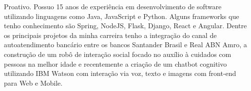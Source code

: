 

\begin{cvparagraph}

Proativo. Possuo 15 anos de experiência em desenvolvimento de software utilizando linguagens como Java, JavaScript e Python. Alguns frameworks que tenho conhecimento são Spring, NodeJS, Flask, Django, React e Angular. Dentre os principais projetos da minha carreira tenho a integração do canal de autoatendimento bancário entre os bancos Santander Brasil e Real ABN Amro, a construção de um robô de interação social focado no auxílio à cuidados com pessoas na melhor idade e recentemente a criação de um chatbot cognitivo utilizando IBM Watson com interação via voz, texto e imagens com front-end para Web e Mobile.
\end{cvparagraph}
